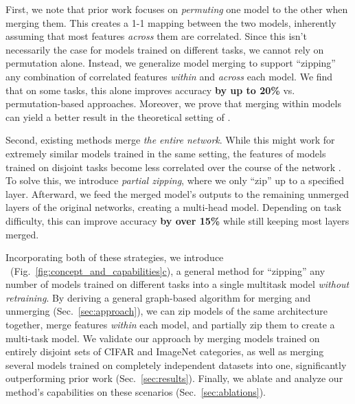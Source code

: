 First, we note that prior work focuses on \textit{permuting} one model to the other when merging them. This creates a 1-1 mapping between the two models, inherently assuming that most features \textit{across} them are correlated. Since this isn't necessarily the case for models trained on different tasks, we cannot rely on permutation alone. 
Instead, we generalize model merging to support ``zipping'' any combination of correlated features \textit{within} and \textit{across} each model.
We find that on some tasks, this alone improves accuracy \textbf{by up to 20\%} vs. 
permutation-based approaches.
Moreover, we prove that merging within models can yield a better result in the theoretical setting of \citet{entezari2021role}.

Second, existing methods merge \textit{the entire network}. While this might work for extremely similar models trained in the same setting, the features of models trained on disjoint tasks become less correlated over the course of the network \cite{kornblith2019similarity}. To solve this, we introduce \textit{partial zipping}, where we only ``zip'' up to a specified layer. Afterward, we feed the merged model's outputs to the remaining unmerged layers of the original networks, creating a multi-head model. Depending on task difficulty, this can improve accuracy \textbf{by over 15\%} while still keeping most layers merged.


Incorporating both of these strategies, we introduce \name{}\ (Fig.~\ref{fig:concept_and_capabilities}\hyperref[fig:concept_and_capabilities]{c}), a general method for ``zipping'' any number of models trained on different tasks into a single multitask model \textit{without retraining}.
By deriving a general graph-based algorithm for merging and unmerging (Sec.~\ref{sec:approach}), we can zip models of the same architecture together, 
merge features \textit{within} each model,
and partially zip them to create a multi-task model.
We validate our approach by merging models trained on entirely disjoint sets of CIFAR \cite{krizhevsky2009cifar} and ImageNet \cite{deng2009imagenet} categories, as well as merging several models trained on completely independent datasets into one, significantly outperforming prior work (Sec.~\ref{sec:results}). 
Finally, we ablate and analyze our method's capabilities on these scenarios (Sec.~\ref{sec:ablations}).